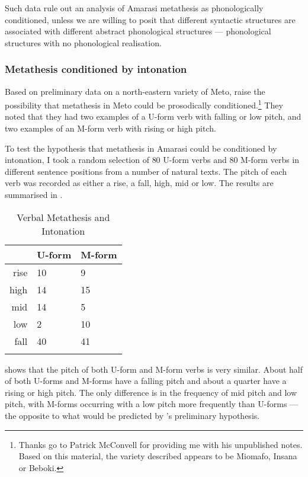 Such data rule out an analysis of Amarasi metathesis
as phonologically conditioned,
unless we are willing to posit that different
syntactic structures are associated with different abstract
phonological structures ---
phonological structures with no phonological realisation.

\subsubsection{Metathesis conditioned by intonation}\label{sec:MetConInt}
Based on preliminary data on a north-eastern variety of Meto, \cite{mccko96}
raise the possibility that metathesis in Meto could be prosodically conditioned.\footnote{
		Thanks go to Patrick McConvell for providing me with his unpublished notes.
		Based on this material, the variety described appears to be Miomafo, Insana or Beboki.}
They noted that they had two examples of a U-form verb with falling or low pitch,
and two examples of an M-form verb with rising or high pitch.

To test the hypothesis that metathesis in Amarasi could be conditioned by intonation,
I took a random selection of 80 U-form verbs and 80 M-form verbs
in different sentence positions from a number of natural texts.
The pitch of each verb was recorded as either a rise, a fall, high, mid or low.
The results are summarised in .

\begin{table}[h]
	\caption{Verbal Metathesis and Intonation}\label{tab:VerMetInt}
	\centering
		\begin{tabular}{rll}\lsptoprule
						& U-form	& M-form	\\ \midrule
			rise	& 10			& 9				\\
			high	& 14			& 15			\\
			mid		& 14			& 5				\\
			low		& 2				& 10			\\
			fall	&	40			& 41			\\
			\lspbottomrule
		\end{tabular}
\end{table}

 shows that the pitch of both U-form
and M-form verbs is very similar.
About half of both U-forms and M-forms have a falling pitch
and about a quarter have a rising or high pitch.
The only difference is in the frequency  of mid pitch and low pitch,
with M-forms occurring with a low pitch more frequently than U-forms
--- the opposite to what would be predicted by \citeauthor{mccko96}'s preliminary hypothesis.

